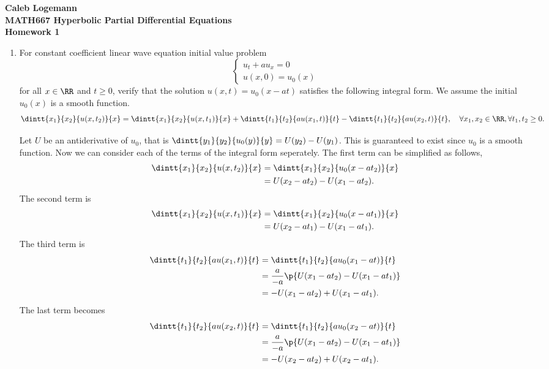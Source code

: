 \documentclass[11pt, oneside]{article}
\begin{document}
\noindent \textbf{\Large{Caleb Logemann \\
MATH667 Hyperbolic Partial Differential Equations \\
Homework 1
}}

%
\begin{enumerate}
  \item %
    For constant coefficient linear wave equation initial value problem
    \[
      \begin{cases}
        u_t + a u_x = 0 \\
        u(x, 0) = u_0(x)
      \end{cases}
    \]
    for all $x \in \RR$ and $t \ge 0$, verify that the solution
    $u(x, t) = u_0(x - at)$ satisfies the following integral form.
    We assume the initial $u_0(x)$ is a smooth function.
    \[
      \dintt{x_1}{x_2}{u(x, t_2)}{x} = \dintt{x_1}{x_2}{u(x, t_1)}{x} +
      \dintt{t_1}{t_2}{au(x_1, t)}{t} - \dintt{t_1}{t_2}{au(x_2, t)}{t}, \quad
      \forall x_1, x_2 \in \RR, \forall t_1, t_2 \ge 0.
    \]

    Let $U$ be an antiderivative of $u_0$, that is
    $\dintt{y_1}{y_2}{u_0(y)}{y} = U(y_2) - U(y_1)$.
    This is guaranteed to exist since $u_0$ is a smooth function.
    Now we can consider each of the terms of the integral form seperately.
    The first term can be simplified as follows,
    \begin{align*}
      \dintt{x_1}{x_2}{u(x, t_2)}{x} &= \dintt{x_1}{x_2}{u_0(x - at_2)}{x} \\
      &= U(x_2 - at_2) - U(x_1 - at_2).
    \end{align*}
    The second term is
    \begin{align*}
      \dintt{x_1}{x_2}{u(x, t_1)}{x} &= \dintt{x_1}{x_2}{u_0(x - at_1)}{x} \\
      &= U(x_2 - at_1) - U(x_1 - at_1).
    \end{align*}
    The third term is
    \begin{align*}
      \dintt{t_1}{t_2}{au(x_1, t)}{t} &= \dintt{t_1}{t_2}{au_0(x_1 - at)}{t} \\
      &= \frac{a}{-a} \p{U(x_1 - at_2) - U(x_1 - at_1)} \\
      &= - U(x_1 - at_2) + U(x_1 - at_1).
    \end{align*}
    The last term becomes
    \begin{align*}
      \dintt{t_1}{t_2}{au(x_2, t)}{t} &= \dintt{t_1}{t_2}{au_0(x_2 - at)}{t} \\
      &= \frac{a}{-a} \p{U(x_1 - at_2) - U(x_1 - at_1)} \\
      &= -U(x_2 - at_2) + U(x_2 - at_1).
    \end{align*}


\end{enumerate}
\end{document}
